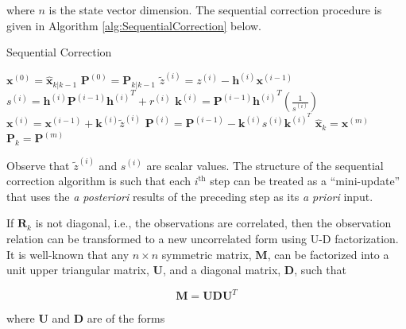 where $n$ is the state vector dimension. The sequential correction procedure is given in
Algorithm \ref{alg:SequentialCorrection} below.

\begin{algorithm}
    \caption{Sequential Correction}
    \label{alg:SequentialCorrection}
    \begin{algorithmic}
        \STATE $\mathbf{x}^{(0)} = \hat{\mathbf{x}}_{k|k-1}$
        \STATE $\mathbf{P}^{(0)} = \mathbf{P}_{k|k-1}$
            \STATE $\tilde{z}^{(i)} = z^{(i)} - \mathbf{h}^{(i)} \mathbf{x}^{(i-1)}$
            \STATE $s^{(i)} = \mathbf{h}^{(i)} \mathbf{P}^{(i-1)} {\mathbf{h}^{(i)}}^T + r^{(i)}$
            \STATE $\mathbf{k}^{(i)} = \mathbf{P}^{(i-1)} {\mathbf{h}^{(i)}}^T \left( \displaystyle{\frac { 1 } { s^{(i)} }} \right)$
            \STATE $\mathbf{x}^{(i)} = \mathbf{x}^{(i-1)} + \mathbf{k}^{(i)} \tilde{z}^{(i)}$
            \STATE $\mathbf{P}^{(i)}  = \mathbf{P}^{(i-1)} - \mathbf{k}^{(i)} s^{(i)} \mathbf{k}^{(i)^T}$
        \ENDFOR
        \STATE $\hat{\mathbf{x}}_{k} = \mathbf{x}^{(m)}$
        \STATE $\mathbf{P}_{k} = \mathbf{P}^{(m)}$
    \end{algorithmic}
\end{algorithm}

Observe that $\tilde{z}^{(i)}$ and $s^{(i)}$ are scalar values.
The structure of the sequential correction algorithm is such that each $i^{\text{th}}$ step
can be treated as a “mini-update” that uses the \textit{a posteriori} results of the
preceding step as its \textit{a priori} input.

If $\mathbf{R}_k$ is not diagonal, i.e., the observations are correlated, then the
observation relation can be transformed to a new uncorrelated form using U-D factorization.
It is well-known that any $n \times n$ symmetric matrix, $\mathbf{M}$, can be factorized
into a unit upper triangular matrix, $\mathbf{U}$, and a diagonal matrix, $\mathbf{D}$,
such that

\begin{equation*}
    \mathbf{M} = \mathbf{U} \mathbf{D} \mathbf{U}^T
\end{equation*}

where $\mathbf{U}$ and $\mathbf{D}$ are of the forms

